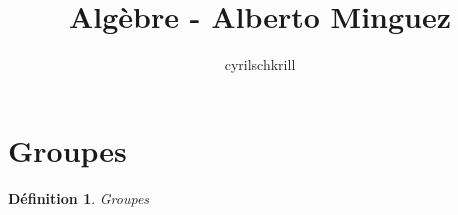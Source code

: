 \documentclass{article}
\title{Algèbre - Alberto Minguez}
\author{cyrilschkrill}
\newtheorem{definition}{Définition}[section]
\begin{document}
\maketitle
\section{Groupes}
\begin{definition} Groupes	
\end{definition}
\end{document}
